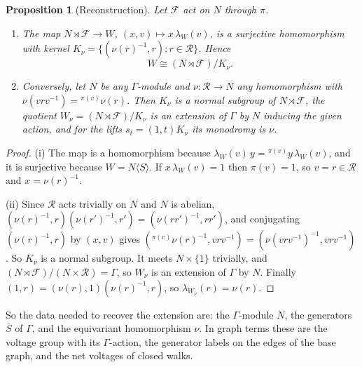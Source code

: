 \documentclass[12pt,letterpaper]{article}
\numberwithin{equation}{section}
\theoremstyle{plain}
\newtheorem{proposition}[theorem]{Proposition}
\theoremstyle{definition}
\newcommand{\act}[2]{{}^{#1}\!#2}          %
\newcommand{\fr}{\mathcal{F}}             %
\newcommand{\rel}{\mathcal{R}}            %
\begin{document}
\begin{proposition}[Reconstruction]\label{prop:reconstruct}
Let $\fr$ act on $N$ through $\pi$.
\begin{enumerate}[label=\textup{(\roman*)},itemsep=1pt]
\item The map $N\rtimes\fr\to W$, $(x,v)\mapsto x\,\lambda_W(v)$, is a
surjective homomorphism with kernel
$K_\nu=\{(\nu(r)^{-1},r):r\in\rel\}$. Hence
\[
W\cong(N\rtimes\fr)/K_\nu .
\]
\item Conversely, let $N$ be any $\Gamma$-module and
$\nu:\rel\to N$ any homomorphism with
$\nu(vrv^{-1})=\act{\pi(v)}{\nu(r)}$. Then $K_\nu$ is a normal subgroup
of $N\rtimes\fr$, the quotient $W_\nu=(N\rtimes\fr)/K_\nu$ is an extension
of $\Gamma$ by $N$ inducing the given action, and for the lifts
$s_t=(1,t)K_\nu$ its monodromy is $\nu$.
\end{enumerate}
\end{proposition}

\begin{proof}
(i) The map is a homomorphism because
$\lambda_W(v)\,y=\act{\pi(v)}{y}\,\lambda_W(v)$, and it is surjective
because $W=N\langle S\rangle$. If $x\,\lambda_W(v)=1$ then $\pi(v)=1$, so
$v=r\in\rel$ and $x=\nu(r)^{-1}$.

(ii) Since $\rel$ acts trivially on $N$ and $N$ is abelian,
$(\nu(r)^{-1},r)(\nu(r')^{-1},r')=(\nu(rr')^{-1},rr')$, and conjugating
$(\nu(r)^{-1},r)$ by $(x,v)$ gives
$(\act{\pi(v)}{\nu(r)}^{-1},vrv^{-1})=(\nu(vrv^{-1})^{-1},vrv^{-1})$. So
$K_\nu$ is a normal subgroup. It meets $N\times\{1\}$ trivially, and
$(N\rtimes\fr)/(N\times\rel)=\Gamma$, so $W_\nu$ is an extension of
$\Gamma$ by $N$. Finally $(1,r)=(\nu(r),1)(\nu(r)^{-1},r)$, so
$\lambda_{W_\nu}(r)=\nu(r)$.
\end{proof}

So the data needed to recover the extension are: the $\Gamma$-module $N$,
the generators $\overline{S}$ of $\Gamma$, and the equivariant
homomorphism $\nu$. In graph terms these are the voltage group with its
$\Gamma$-action, the generator labels on the edges of the base graph, and
the net voltages of closed walks.
\end{document}
